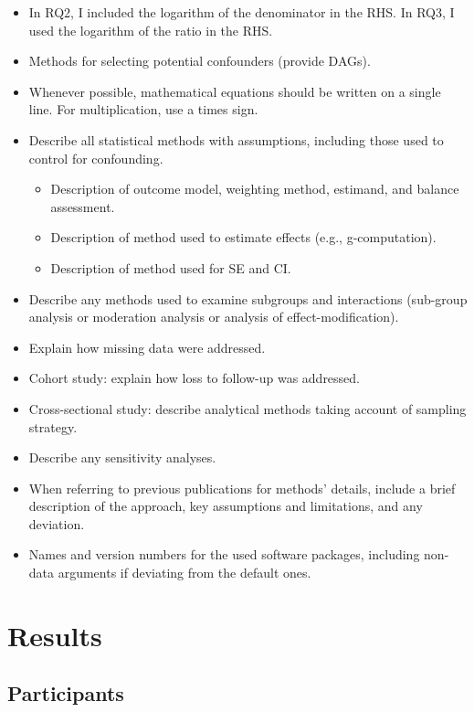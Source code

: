 \documentclass[
  letterpaper,
  DIV=11,
  numbers=noendperiod]{scrartcl}
\providecommand{\tightlist}{%
  \setlength{\itemsep}{0pt}\setlength{\parskip}{0pt}}\usepackage{longtable,booktabs,array}
\begin{document}
\begin{itemize}
\item
  In RQ2, I included the logarithm of the denominator in the RHS. In
  RQ3, I used the logarithm of the ratio in the RHS.
\item
  Methods for selecting potential confounders (provide DAGs).
\item
  Whenever possible, mathematical equations should be written on a
  single line. For multiplication, use a times sign.
\item
  Describe all statistical methods with assumptions, including those
  used to control for confounding.

  \begin{itemize}
  \tightlist
  \item
    Description of outcome model, weighting method, estimand, and
    balance assessment.
  \item
    Description of method used to estimate effects (e.g.,
    g-computation).
  \item
    Description of method used for SE and CI.
  \end{itemize}
\item
  Describe any methods used to examine subgroups and interactions
  (sub-group analysis or moderation analysis or analysis of
  effect-modification).
\item
  Explain how missing data were addressed.
\item
  Cohort study: explain how loss to follow-up was addressed.
\item
  Cross-sectional study: describe analytical methods taking account of
  sampling strategy.
\item
  Describe any sensitivity analyses.
\item
  When referring to previous publications for methods' details, include
  a brief description of the approach, key assumptions and limitations,
  and any deviation.
\item
  Names and version numbers for the used software packages, including
  non-data arguments if deviating from the default ones.
\end{itemize}

\section{Results}\label{sec-res}

\subsection{Participants}\label{sec-res-participants}
\end{document}
